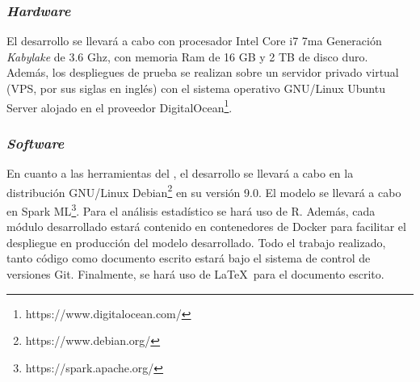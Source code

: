 \subsubsection*{\textit{Hardware}}
El desarrollo se llevará a cabo con procesador Intel Core i7 7ma Generación \textit{Kabylake} de 3.6 Ghz, con memoria Ram de 16 GB y 2 TB de disco duro. Además, los despliegues de prueba se realizan sobre un servidor privado virtual (VPS, por sus siglas en inglés) con el sistema operativo GNU/Linux Ubuntu Server alojado en el proveedor DigitalOcean\footnote{https://www.digitalocean.com/}.

\subsubsection*{\textit{Software}}
En cuanto a las herramientas del , el desarrollo se llevará a cabo en la distribución GNU/Linux Debian\footnote{https://www.debian.org/} en su versión 9.0. El modelo se llevará a cabo en Spark ML\footnote{https://spark.apache.org/}. Para el análisis estadístico se hará uso de R. Además, cada módulo desarrollado estará contenido en contenedores de Docker para facilitar el despliegue en producción del modelo desarrollado. Todo el trabajo realizado, tanto código como documento escrito estará bajo el sistema de control de versiones Git. Finalmente, se hará uso de \LaTeX\ para el documento escrito.

%
